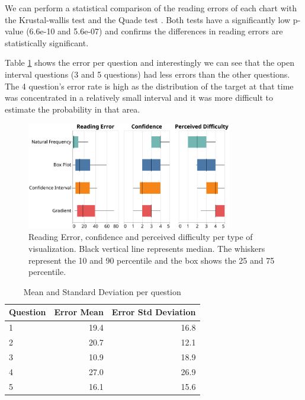 \documentclass[a4paper,3p,sort&compress]{elsarticle}
\begin{document}
We can perform a statistical comparison of the reading errors of each chart with the Krustal-wallis test \cite{krustal} and 
the Quade test \cite{quade_rank_1967}. Both tests have a 
significantly low p-value (6.6e-10 and 5.6e-07) and confirms the differences in reading errors are statistically significant.

Table \ref{table:resultsperquestion} shows the error per question and interestingly we can see that the open interval questions (3 and 5 questions) 
had less errors than the other questions. The 4 question's error rate is high as the distribution of the target 
at that time was concentrated in a relatively 
small interval and it was more difficult to estimate the probability in that area. 

\begin{figure}
  \centering
  \includegraphics[width=0.8\textwidth]{comparison}
  \caption{\label{figure:errors}Reading Error, confidence and perceived difficulty per 
  type of visualization. Black vertical line represents median.
  The whiskers represent the 10 and 90 percentile and the box shows the 25 and 
  75 percentile.}
\end{figure}


\begin{table}[h!]
  \centering
  \begin{tabular}{lrr}
    \toprule
    {}Question &     Error Mean &        Error Std Deviation \\
    \midrule
    1 &  19.4 &  16.8 \\
    2 &  20.7 &  12.1 \\
    3 &  10.9 &  18.9 \\
    4 &  27.0 &  26.9 \\
    5 &  16.1 &  15.6 \\
    \bottomrule
    \end{tabular}
  \caption{Mean and Standard Deviation per question}
  \label{table:resultsperquestion}
  \end{table}
\end{document}
